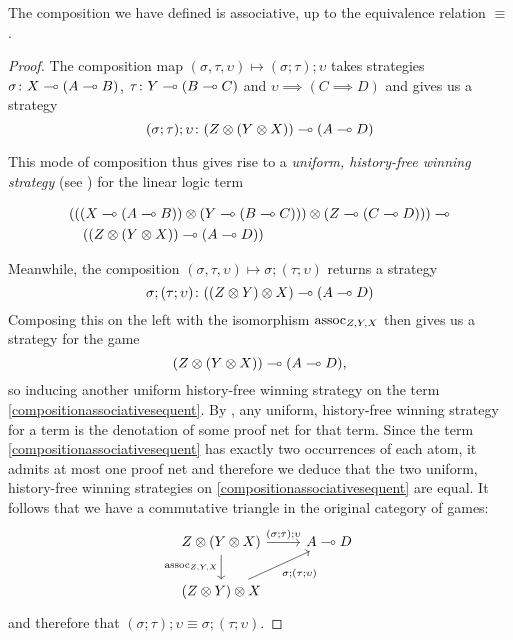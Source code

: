\documentclass{article}
\begin{document}
\begin{proposition}
  \label{compositionIsAssociative}
  The composition we have defined is associative, up to the equivalence relation $\equiv$.  
\end{proposition}
\begin{proof}
  The composition map $(\sigma,\tau,\upsilon)\mapsto (\sigma;\tau);\upsilon$ takes strategies $\sigma\colon X\multimap (A\multimap B)$, $\tau\colon Y\multimap (B\multimap C)$ and $\upsilon\implies (C\implies D)$ and gives us a strategy
  \[
    (\sigma;\tau);\upsilon\colon (Z \otimes (Y\otimes X))\multimap (A\multimap D)
    \]
  
  This mode of composition thus gives rise to a \emph{uniform, history-free winning strategy} (see \cite[3.6]{abramskyjagadeesangames}) for the linear logic term

  \begin{equation}
    \label{compositionassociativesequent}
    \begin{split}
      &(((X\multimap(A\multimap B)) \otimes (Y \multimap (B \multimap C))) \otimes (Z \multimap (C \multimap D))) \multimap\\
      &\quad((Z \otimes (Y\otimes X)) \multimap (A \multimap D))
    \end{split}
  \end{equation}

  Meanwhile, the composition $(\sigma,\tau,\upsilon)\mapsto\sigma;(\tau;\upsilon)$ returns a strategy
  \[
    \sigma;(\tau;\upsilon)\colon ((Z\otimes Y) \otimes X)\multimap (A\multimap D)
    \]
  Composing this on the left with the isomorphism $\operatorname{assoc}_{Z,Y,X}$ then gives us a strategy for the game
  \[
    (Z \otimes (Y \otimes X))\multimap (A\multimap D),
    \]
  so inducing another uniform history-free winning strategy on the term \eqref{compositionassociativesequent}.  
  By \cite[Theorem 1]{abramskyjagadeesangames}, any uniform, history-free winning strategy for a term is the denotation of some proof net for that term.  
  Since the term \eqref{compositionassociativesequent} has exactly two occurrences of each atom, it admits at most one proof net and therefore we deduce that the two uniform, history-free winning strategies on \eqref{compositionassociativesequent} are equal.  
  It follows that we have a commutative triangle in the original category of games:
  \[
    \begin{tikzcd}
      Z \tensor (Y \tensor X) \arrow[r, "(\sigma;\tau);\upsilon"] \arrow[d, "\assoc_{Z,Y,X}"']
        & A \implies D \\
      (Z \tensor Y) \tensor X \arrow[ur, "\sigma;(\tau;\upsilon)"']
        &
    \end{tikzcd}
    \]
  and therefore that $(\sigma;\tau);\upsilon\equiv\sigma;(\tau;\upsilon)$.
\end{proof}
\end{document}
